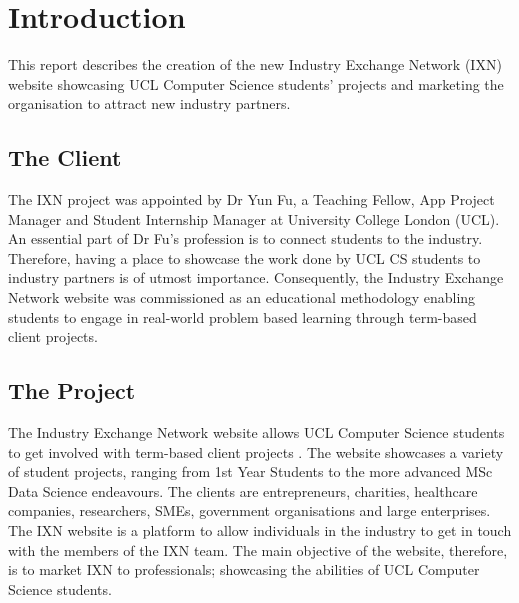 \documentclass[fontsize=11pt]{extarticle}
\numberwithin{figure}{section} %
\begin{document}
\newpage

\clearpage
{}
\hypertarget{introduction}{%
\section{Introduction}\label{introduction}}

This report describes the creation of the new Industry Exchange Network
(IXN) website showcasing UCL Computer Science students' projects and
marketing the organisation to attract new industry partners.

\hypertarget{the-client}{%
\subsection{The Client}\label{the-client}}

The IXN project was appointed by Dr Yun Fu, a Teaching Fellow, App
Project Manager and Student Internship Manager at University College
London (UCL). An essential part of Dr Fu's profession is to connect
students to the industry. Therefore, having a place to showcase the work
done by UCL CS students to industry partners is of utmost importance.
Consequently, the Industry Exchange Network website was commissioned as
an educational methodology enabling students to engage in real-world
problem based learning through term-based client projects.

\hypertarget{the-project}{%
\subsection{The Project}\label{the-project}}

The Industry Exchange Network website allows UCL Computer Science
students to get involved with term-based client projects \cite{g1}. The
website showcases a variety of student projects, ranging from 1st Year
Students to the more advanced MSc Data Science endeavours. The clients
are entrepreneurs, charities, healthcare companies, researchers, SMEs,
government organisations and large enterprises. The IXN website is a
platform to allow individuals in the industry to get in touch with the
members of the IXN team. The main objective of the website, therefore,
is to market IXN to professionals; showcasing the abilities of UCL
Computer Science students.
\end{document}
